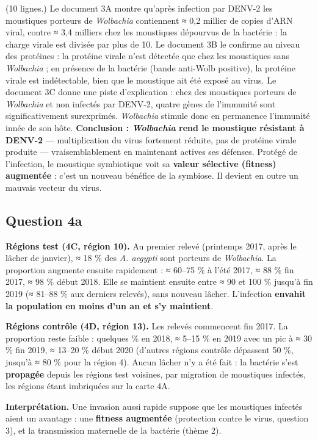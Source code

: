 \documentclass[11pt,a4paper]{article}
\begin{document}
(10 lignes.) Le document 3A montre qu'après infection par DENV-2 les moustiques porteurs de \emph{Wolbachia} contiennent ≈ 0,2 millier de copies d'ARN viral, contre ≈ 3,4 milliers chez les moustiques dépourvus de la bactérie : la charge virale est divisée par plus de 10. Le document 3B le confirme au niveau des protéines : la protéine virale n'est détectée que chez les moustiques sans \emph{Wolbachia} ; en présence de la bactérie (bande anti-Wolb positive), la protéine virale est indétectable, bien que le moustique ait été exposé au virus. Le document 3C donne une piste d'explication : chez des moustiques porteurs de \emph{Wolbachia} et non infectés par DENV-2, quatre gènes de l'immunité sont significativement surexprimés. \emph{Wolbachia} stimule donc en permanence l'immunité innée de son hôte. \textbf{Conclusion : \emph{Wolbachia} rend le moustique résistant à DENV-2} --- multiplication du virus fortement réduite, pas de protéine virale produite --- vraisemblablement en maintenant actives ses défenses. Protégé de l'infection, le moustique symbiotique voit sa \textbf{valeur sélective (fitness) augmentée} : c'est un nouveau bénéfice de la symbiose. Il devient en outre un mauvais vecteur du virus.

\hypertarget{question-4a}{%
\subsection{Question 4a}\label{question-4a}}

\textbf{Régions test (4C, région 10).} Au premier relevé (printemps 2017, après le lâcher de janvier), ≈ 18 \% des \emph{A. aegypti} sont porteurs de \emph{Wolbachia}. La proportion augmente ensuite rapidement : ≈ 60--75 \% à l'été 2017, ≈ 88 \% fin 2017, ≈ 98 \% début 2018. Elle se maintient ensuite entre ≈ 90 et 100 \% jusqu'à fin 2019 (≈ 81--88 \% aux derniers relevés), sans nouveau lâcher. L'infection \textbf{envahit la population en moins d'un an et s'y maintient}.

\textbf{Régions contrôle (4D, région 13).} Les relevés commencent fin 2017. La proportion reste faible : quelques \% en 2018, ≈ 5--15 \% en 2019 avec un pic à ≈ 30 \% fin 2019, ≈ 13--20 \% début 2020 (d'autres régions contrôle dépassent 50 \%, jusqu'à ≈ 80 \% pour la région 4). Aucun lâcher n'y a été fait : la bactérie s'est \textbf{propagée} depuis les régions test voisines, par migration de moustiques infectés, les régions étant imbriquées sur la carte 4A.

\textbf{Interprétation.} Une invasion aussi rapide suppose que les moustiques infectés aient un avantage : une \textbf{fitness augmentée} (protection contre le virus, question 3), et la transmission maternelle de la bactérie (thème 2).
\end{document}

